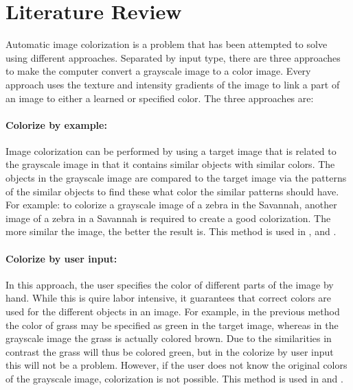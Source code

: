 \section{Literature Review} \label{sec:litreview}
Automatic image colorization is a problem that has been attempted to solve using different approaches. Separated by input type, there are three approaches to make the computer convert a grayscale image to a color image. Every approach uses the texture and intensity gradients of the image to link a part of an image to either a learned or specified color. The three approaches are:

\paragraph{Colorize by example:} Image colorization can be performed by using a target image that is related to the grayscale image in that it contains similar objects with similar colors. The objects in the grayscale image are compared to the target image via the patterns of the similar objects to find these what color the similar patterns should have. For example: to colorize a grayscale image of a zebra in the Savannah, another image of a zebra in a Savannah is required to create a good colorization. The more similar the image, the better the result is. This method is used in \cite{Charpiat}, \cite{Gupta} and \cite{Zheng}.
	
\paragraph{Colorize by user input:} In this approach, the user specifies the color of different parts of the image by hand. While this is quire labor intensive, it guarantees that correct colors are used for the different objects in an image. For example, in the previous method the color of grass may be specified as green in the target image, whereas in the grayscale image the grass is actually colored brown. Due to the similarities in contrast the grass will thus be colored green, but in the colorize by user input this will not be a problem. However, if the user does not know the original colors of the grayscale image, colorization is not possible. This method is used in \cite{Horiuchi} and \cite{Levin}.
	
